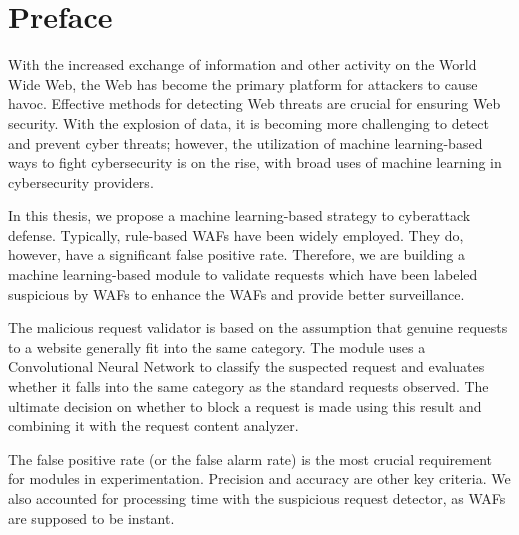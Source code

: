 \chapter*{Preface}
\thispagestyle{fancy}
\label{tom_tat}
\hspace*{5cm}

With the increased exchange of information and other activity on the World Wide Web, the Web has become the primary platform for attackers to cause havoc. Effective methods for detecting Web threats are crucial for ensuring Web security. With the explosion of data, it is becoming more challenging to detect and prevent cyber threats; however, the utilization of machine learning-based ways to fight cybersecurity is on the rise, with broad uses of machine learning in cybersecurity providers. 

In this thesis, we propose a machine learning-based strategy to cyberattack defense. Typically, rule-based WAFs have been widely employed. They do, however, have a significant false positive rate. Therefore, we are building a machine learning-based module to validate requests which have been labeled suspicious by WAFs to enhance the WAFs and provide better surveillance. 

The malicious request validator is based on the assumption that genuine requests to a website generally fit into the same category. The module uses a Convolutional Neural Network to classify the suspected request and evaluates whether it falls into the same category as the standard requests observed. The ultimate decision on whether to block a request is made using this result and combining it with the request content analyzer.


The false positive rate (or the false alarm rate) is the most crucial requirement for modules in experimentation. Precision and accuracy are other key criteria. We also accounted for processing time with the suspicious request detector, as WAFs are supposed to be instant.
	
\cleardoublepage